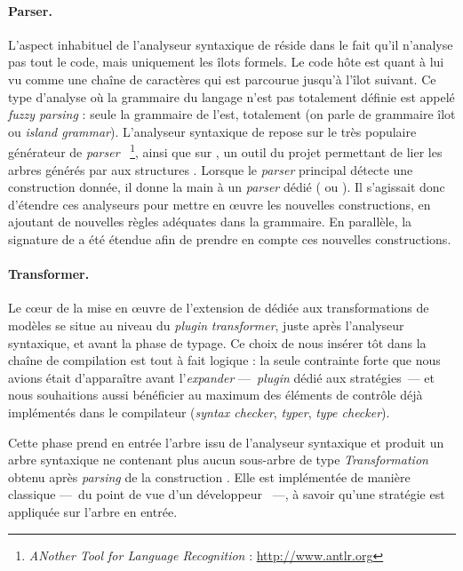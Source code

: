 \paragraph{Parser.} L'aspect inhabituel de l'analyseur syntaxique de {\tom}
réside dans le fait qu'il n'analyse pas tout le code, mais uniquement les îlots
formels. Le code hôte est quant à lui vu comme une chaîne de caractères qui est
parcourue jusqu'à l'îlot suivant. Ce type d'analyse où la grammaire du langage
n'est pas totalement définie est appelé \emph{fuzzy parsing} : seule la
grammaire de {\tom} l'est, totalement (on parle de grammaire îlot ou
\emph{island grammar}). L'analyseur syntaxique de {\tom} repose sur le très
populaire générateur de \emph{parser} {\antlr}~\footnote{\emph{ANother Tool for
Language Recognition} : \url{http://www.antlr.org}}, ainsi que sur
{\gomantlradapter}, un outil du projet permettant de lier les arbres générés
par {\antlr} aux structures {\gom}. Lorsque le \emph{parser} principal détecte
une construction donnée, il donne la main à un \emph{parser} dédié ({\tom} ou
{\gom}). Il s'agissait donc d'étendre ces analyseurs pour mettre en œuvre les
nouvelles constructions, en ajoutant de nouvelles règles adéquates dans la
grammaire. En parallèle, la signature de {\tom} a été étendue afin de prendre
en compte ces nouvelles constructions.


\paragraph{Transformer.} Le cœur de la mise en œuvre de l'extension de {\tom}
dédiée aux transformations de modèles se situe au niveau du \emph{plugin}
\emph{transformer}, juste après l'analyseur syntaxique, et avant la phase de
typage. Ce choix de nous insérer tôt dans la chaîne de compilation est tout à
fait logique : la seule contrainte forte que nous avions était d'apparaître
avant l'\emph{expander} ---~\emph{plugin} dédié aux stratégies~--- et nous
souhaitions aussi bénéficier au maximum des éléments de contrôle déjà
implémentés dans le compilateur {\tom} (\emph{syntax checker}, \emph{typer},
\emph{type checker}).

Cette phase prend en entrée l'arbre issu de l'analyseur syntaxique et produit
un arbre syntaxique ne contenant plus aucun sous-arbre de type
\emph{Transformation} obtenu après \emph{parsing} de la construction
. Elle est implémentée de manière classique ---~du point
de vue d'un développeur {\tom}~---, à savoir qu'une stratégie {\tom} est
appliquée sur l'arbre en entrée.

